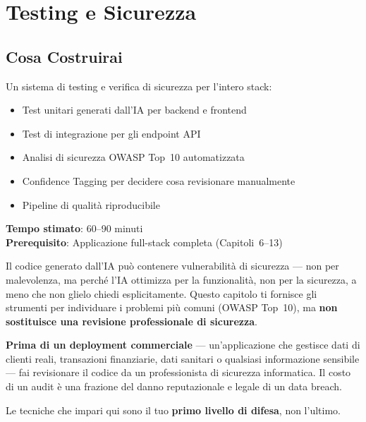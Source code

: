 \chapter{Testing e Sicurezza}

\section*{Cosa Costruirai}
Un sistema di testing e verifica di sicurezza per l'intero stack:
\begin{itemize}
  \item Test unitari generati dall'IA per backend e frontend
  \item Test di integrazione per gli endpoint API
  \item Analisi di sicurezza OWASP Top~10 automatizzata
  \item Confidence Tagging per decidere cosa revisionare manualmente
  \item Pipeline di qualità riproducibile
\end{itemize}

\textbf{Tempo stimato}: 60--90 minuti\\
\textbf{Prerequisito}: Applicazione full-stack completa (Capitoli~6--13)

\begin{dangerbox}[title={La Sicurezza Non è Opzionale}]
Il codice generato dall'IA può contenere vulnerabilità di sicurezza --- non per malevolenza, ma perché l'IA ottimizza per la funzionalità, non per la sicurezza, a meno che non glielo chiedi esplicitamente. Questo capitolo ti fornisce gli strumenti per individuare i problemi più comuni (OWASP Top~10), ma \textbf{non sostituisce una revisione professionale di sicurezza}.

\textbf{Prima di un deployment commerciale} --- un'applicazione che gestisce dati di clienti reali, transazioni finanziarie, dati sanitari o qualsiasi informazione sensibile --- fai revisionare il codice da un professionista di sicurezza informatica. Il costo di un audit è una frazione del danno reputazionale e legale di un data breach.

Le tecniche che impari qui sono il tuo \textbf{primo livello di difesa}, non l'ultimo.
\end{dangerbox}

